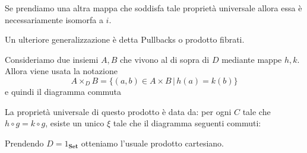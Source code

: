 \documentclass[a4paper]{article}
\begin{document}
Se prendiamo una altra mappa che soddisfa tale proprietà universale allora essa
è necessariamente isomorfa a \(i\).

Un ulteriore generalizzazione è detta Pullbacks o prodotto fibrati.

Consideriamo due insiemi \(A,B\) che vivono al di sopra di \(D\)
mediante mappe \(h,k\). Allora viene usata la notazione
\[
    A \times_D B = \{(a,b) \in A\times B \,|\, h(a) = k(b)\}
\]
e quindi il diagramma commuta
La proprietà universale di questo prodotto è data da: per ogni \(C\)
tale che \(h\circ g = k \circ g\), esiste un unico \(\xi\)
tale che il diagramma seguenti commuti:
\begin{center}
\end{center}

Prendendo \(D = 1_\mathbf{Set}\) otteniamo l'usuale prodotto cartesiano.
\end{document}
